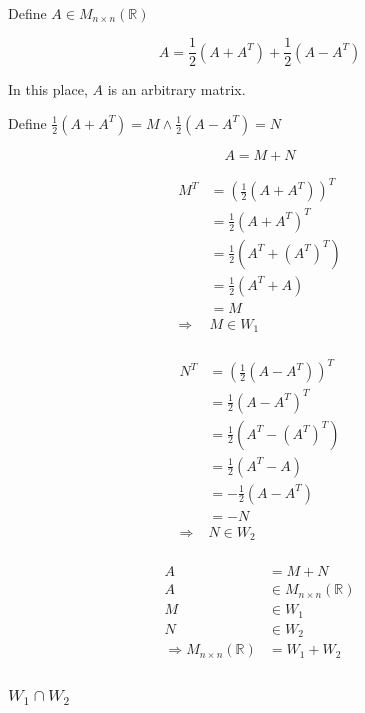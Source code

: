 \documentclass{article}
\def\R{\mathbb{R}}
\begin{document}
~

Define $A \in M_{n\times n}(\R)$

$$
A = \frac{1}{2}(A+A^T) + \frac{1}{2}(A-A^T)
$$

In this place, $A$ is an arbitrary matrix.

Define $\frac{1}{2}(A+A^T)=M \land \frac{1}{2}(A-A^T)=N$

$$
A = M + N
$$

\begin{equation}
\tag{1.3.1-1}
\begin{split}
M^T &= (\frac{1}{2}(A+A^T))^T\\
&= \frac{1}{2}(A+A^T)^T\\
&= \frac{1}{2}(A^T+(A^T)^T)\\
&= \frac{1}{2}(A^T+A)\\
&= M\\
\Rightarrow &M\in W_1\\
\end{split}
\end{equation}

\begin{equation}
\tag{1.3.1-2}
\begin{split}
N^T &= (\frac{1}{2}(A-A^T))^T\\
&=\frac{1}{2}(A-A^T)^T\\
&=\frac{1}{2}(A^T-(A^T)^T)\\
&=\frac{1}{2}(A^T-A)\\
&= -\frac{1}{2}(A-A^T)\\
&= -N\\
\Rightarrow &N\in W_2\\
\end{split}
\end{equation}

\begin{equation}
\tag{1.3.1-3}
\begin{split}
A &= M+N\\
A &\in M_{n\times n}(\R)\\
M &\in W_1\\
N &\in W_2\\
\Rightarrow M_{n\times n}(\R) &= W_1 + W_2\\
\end{split}
\end{equation}

\subsubsection{$W_1\cap W_2$}
\end{document}
